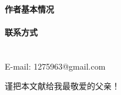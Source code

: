 \begin{publications}


\end{publications}

\begin{resume}

\paragraph{作者基本情况}

\paragraph{联系方式}\mbox{}\\

E-mail: 1275963@gmail.com

\end{resume}

\begin{thanks}

谨把本文献给我最敬爱的父亲！

\end{thanks}
